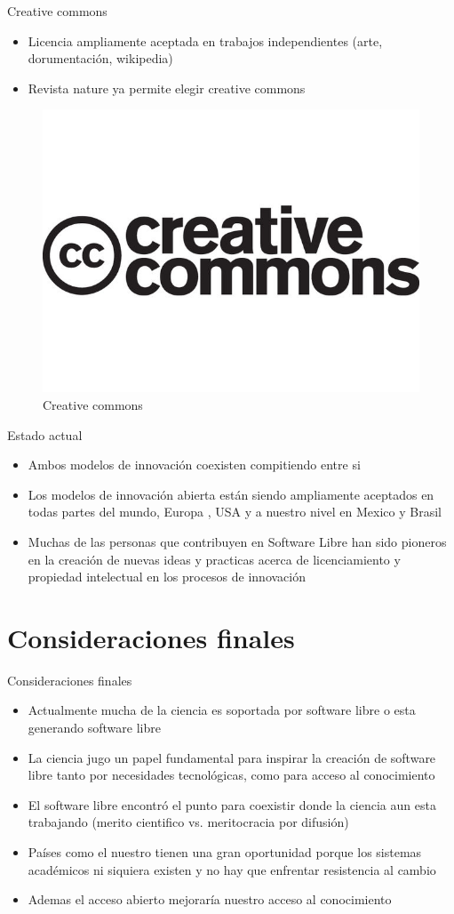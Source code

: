 \documentclass{beamer}
\begin{document}
\begin{frame}{Creative commons}
\begin{itemize}
\item Licencia ampliamente aceptada en trabajos independientes (arte, dorumentación, wikipedia)
\item Revista nature ya permite elegir creative commons \cite{Nature}
\end{itemize}
\begin{figure}[tbph]
\centering
\includegraphics[width=0.25\linewidth]{Figures/creative-commons-logo-640-80.jpg}
\caption{Creative commons}
\label{fig:cc}
\end{figure}
\end{frame}

\begin{frame}{Estado actual}
\begin{itemize}
\item Ambos modelos de innovación coexisten compitiendo entre si \cite{Drive2003}
\item Los modelos de innovación abierta están siendo ampliamente aceptados en todas partes del mundo, Europa \cite{Europa2013}, USA \cite{USA2013} y a nuestro nivel en Mexico\cite{Mx2013} y Brasil\cite{Br2013-}
\item Muchas de las personas que contribuyen en Software Libre han sido pioneros en la creación de nuevas ideas y practicas acerca de licenciamiento y propiedad intelectual en los procesos de innovación \cite{VonKrogh2006}
\end{itemize}
\end{frame}

\section{Consideraciones finales}
\begin{frame}{Consideraciones finales}
\begin{itemize}
\item Actualmente mucha de la ciencia es soportada por software libre o esta generando software libre
\item La ciencia jugo un papel fundamental para inspirar la creación de software libre tanto por necesidades tecnológicas, como para acceso al conocimiento
\item El software libre encontró el punto para coexistir donde la ciencia aun esta trabajando (merito cientifico vs. meritocracia por difusión)
\item Países como el nuestro tienen una gran oportunidad porque los sistemas académicos ni siquiera existen y no hay que enfrentar resistencia al cambio
\item Ademas el acceso abierto mejoraría nuestro acceso al conocimiento
\end{itemize}
\end{frame}
\end{document}

